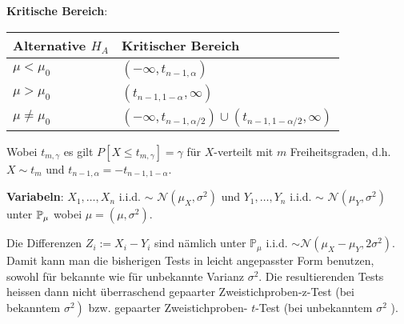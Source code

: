 \textbf{Kritische Bereich}: \renewcommand\arraystretch{1.8}
\begin{center}
    \begin{tabular}{l|l}
  		Alternative $H_A$ & Kritischer Bereich \\
  		\hline
  		$\mu < \mu_0 $ & $(-\infty, t_{n-1, \alpha})$ \\
  		\hline
  		$\mu > \mu_0$ & $(t_{n-1, 1-\alpha}, \infty)$ \\
  		\hline
  		$\mu \neq \mu_0$ & $(-\infty, t_{n-1, \alpha/2}) \cup (t_{n-1, 1-\alpha/2}, \infty)$ 
	\end{tabular}
\end{center}
\renewcommand{\arraystretch}{1}
Wobei $t_{m, \gamma}$ es gilt $P\left[X \leq t_{m, \gamma}\right]=\gamma$ für $X$-verteilt mit $m$ Freiheitsgraden, d.h. $X \sim t_{m}$ und $t_{n-1, \alpha} = -t_{n-1, 1-\alpha}$.


\textbf{Variabeln}: $X_1, \ldots , X_n$ i.i.d. $\sim$ $\mathcal{N}(\mu_X, \sigma^2)$ und $Y_1, \ldots , Y_n$ i.i.d. $\sim$ $\mathcal{N}(\mu_Y, \sigma^2)$ unter $\mathbb{P}_\mu$ wobei $\mu = (\mu, \sigma^2)$.

Die Differenzen $Z_{i}:=X_{i}-Y_{i}$ sind nämlich unter $\mathbb{P}_{\mu}$ i.i.d. $\sim \mathcal{N}\left(\mu_{X}-\mu_{Y}, 2 \sigma^{2}\right)$. Damit kann man die bisherigen Tests in leicht angepasster Form benutzen, sowohl für bekannte wie für unbekannte Varianz $\sigma^{2}$. Die resultierenden Tests heissen dann nicht überraschend gepaarter Zweistichproben-z-Test (bei bekanntem $\left.\sigma^{2}\right)$ bzw. gepaarter Zweistichproben- $t$-Test (bei unbekanntem $\sigma^{2}$ ).


